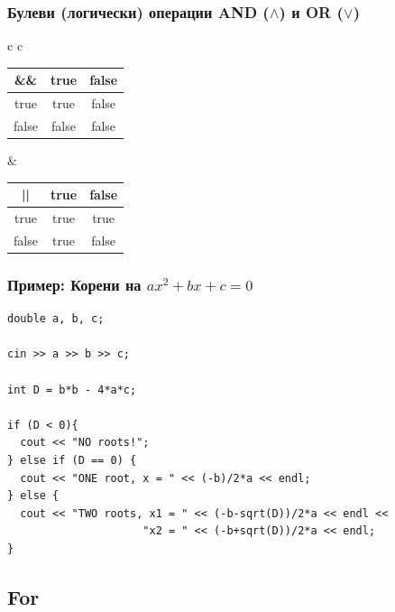 \documentclass{beamer}
\begin{document}
\begin{frame}[fragile]
\frametitle{Булеви (логически) операции AND ($\wedge$) и OR ($\vee$)}

\begin{center}
  

\begin{tabular}{ c c }

\begin{tabular}{ c | c  c }
  \hline                        
  \&\&  & true  & false \\ \hline  
  true  & true  & false \\
  false & false & false \\
  
\end{tabular} &

\begin{tabular}{ c | c  c }
  \hline                        
  ||  & true  & false \\ \hline  
  true  & true  & true \\
  false & true & false \\
  
\end{tabular}

\end{tabular}
\end{center}



\end{frame}


\begin{frame}[fragile]
\frametitle{Пример: Корени на $ax^2+bx+c=0$}

\begin{lstlisting}
double a, b, c;

cin >> a >> b >> c;

int D = b*b - 4*a*c;

if (D < 0){
  cout << "NO roots!";
} else if (D == 0) {
  cout << "ONE root, x = " << (-b)/2*a << endl;
} else {
  cout << "TWO roots, x1 = " << (-b-sqrt(D))/2*a << endl <<
                     "x2 = " << (-b+sqrt(D))/2*a << endl;
}

\end{lstlisting}


\end{frame}


\subsection{For} 
\end{document}

